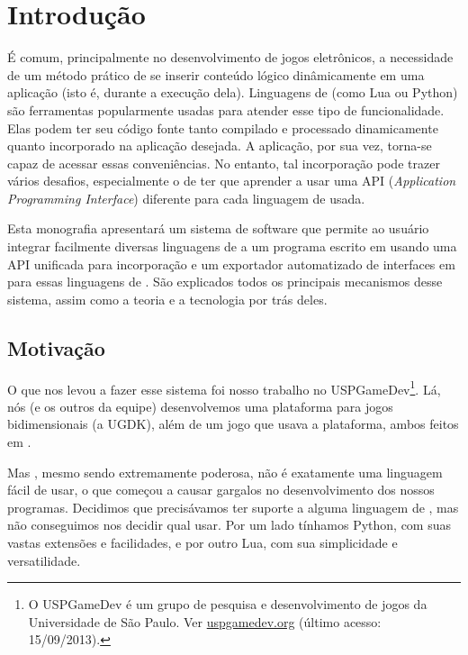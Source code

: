
\chapter{Introdução}
\label{sec:intr}

É comum, principalmente no desenvolvimento de jogos eletrônicos, a necessidade
de um método prático de se inserir conteúdo lógico dinâmicamente em uma
aplicação (isto é, durante a execução dela). Linguagens de \script{} (como Lua ou
Python) são ferramentas popularmente usadas para atender esse tipo de
funcionalidade. Elas podem ter seu código fonte tanto compilado e processado
dinamicamente quanto incorporado na aplicação desejada. A aplicação, por sua
vez, torna-se capaz de acessar essas conveniências. No entanto, tal incorporação
pode trazer vários desafios, especialmente o de ter que aprender a usar uma API
(\textit{Application Programming Interface}) diferente para cada linguagem de
\script{} usada.

Esta monografia apresentará um sistema de software que permite ao usuário
integrar facilmente diversas linguagens de \script{} a um programa escrito em
\CXX{} usando uma API unificada para incorporação e um exportador
automatizado de interfaces em \CXX{} para essas linguagens de \script{}. São
explicados todos os principais mecanismos desse sistema, assim como a teoria e a
tecnologia por trás deles.

\section{Motivação}
\label{sec:intr:motivacao}
O que nos levou a fazer esse sistema foi nosso trabalho no USPGameDev\footnote{
  O USPGameDev é um grupo de pesquisa e desenvolvimento de jogos da
  Universidade de São Paulo. Ver \url{uspgamedev.org} (último acesso: 
  15/09/2013).
}.
Lá, nós (e os outros da equipe) desenvolvemos uma plataforma para jogos
bidimensionais (a UGDK\footnotemark), além de um jogo que usava a plataforma, ambos feitos em \CXX{}.


Mas \CXX{}, mesmo sendo extremamente poderosa, não é exatamente uma linguagem
fácil de usar, o que começou a causar gargalos no desenvolvimento
dos nossos programas. Decidimos que precisávamos ter suporte a alguma linguagem
de \script{}, mas não conseguimos nos decidir qual usar. Por um lado tínhamos
Python, com suas vastas extensões e facilidades, e por outro Lua, com sua
simplicidade e versatilidade.

